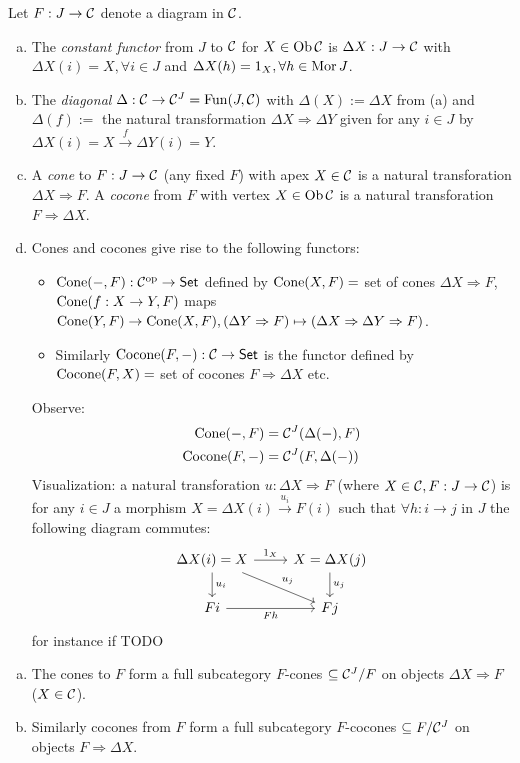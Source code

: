 \documentclass[a4paper]{report}
\begin{document}
\begin{defi} Let $F: J \to \mathcal{C}$ denote a diagram in $\mathcal{C}$.
  \begin{enumerate}[(a)]
    \item The \emph{constant functor} from $J$ to $\mathcal{C}$ for $X \in \operatorname{Ob} \mathcal{C}$ is $\Delta X: J \to \mathcal{C}$ with $\Delta X(i) = X, \forall i \in J$ and $\Delta X(h) = 1_{X}, \forall h \in \operatorname{Mor} J$.
    \item The \emph{diagonal} $\Delta: \mathcal{C} \to \mathcal{C}^{J} = \operatorname{Fun}(J, \mathcal{C})$ with $\Delta(X) := \Delta X$ from (a) and $\Delta(f):= $ the natural transformation $\Delta X \Rightarrow \Delta Y$ given for any $i \in J$ by $\Delta X(i) = X \xrightarrow f \Delta Y(i) = Y$.
    \item A \emph{cone} to $F: J \to \mathcal{C}$ (any fixed $F$) with apex $X \in \mathcal{C}$ is a natural transforation $\Delta X \Rightarrow F$. A \emph{cocone} from $F$ with vertex $X \in \operatorname{Ob} \mathcal{C}$ is a natural transforation $F \Rightarrow \Delta X$.
    \item Cones and cocones give rise to the following functors:
\begin{itemize}
  \item $\operatorname{Cone}(-, F): \mathcal{C}^\text{op} \to \mathsf{Set}$ defined by $\operatorname{Cone}(X,F) = $ set of cones  $\Delta X \Rightarrow F$, $\operatorname{Cone}(f: X \to Y, F)$ maps $\operatorname{Cone}(Y,F) \to \operatorname{Cone}(X,F), (\Delta Y \Rightarrow F) \mapsto (\Delta X \Rightarrow \Delta Y \Rightarrow F)$.
        \item Similarly $\operatorname{Cocone}(F, -): \mathcal{C} \to \mathsf{Set}$ is the functor defined by $\operatorname{Cocone}(F, X) =$ set of cocones $F \Rightarrow \Delta X$ etc.
\end{itemize}
          Observe: \begin{align*}
            \operatorname{Cone}(-,F) &= \mathcal{C}^{J}(\Delta(-),F)\\
            \operatorname{Cocone}(F,-) &= \mathcal{C}^{J}(F, \Delta(-))
          \end{align*}
          Visualization: a natural transforation $u: \Delta X \Rightarrow F$ (where $X \in\mathcal{C}, F: J \to \mathcal{C}$) is for any $i \in J$ a morphism $X = \Delta X(i) \xrightarrow{u_{i}} F(i)$ such that $\forall h: i \to j$ in $J$ the following diagram commutes:
          \[\begin{tikzcd}
\Delta X(i) = X \arrow[d, "u_i"] \arrow[rd, "u_j"] \arrow[r, "1_X"] & X = \Delta X(j) \arrow[d, "u_j"] \\
Fi \arrow[r, "Fh"']                                                 & Fj
\end{tikzcd}\]
          for instance if TODO
  \end{enumerate}
\end{defi}
\begin{rem}
\begin{enumerate}[(a)]
  \item The cones to $F$ form a full subcategory $F$-cones $\subseteq \mathcal{C}^{J}/F$ on objects $\Delta X \Rightarrow F$ ($X \in \mathcal{C}$).
        \item Similarly cocones from $F$ form a full subcategory $F$-cocones $\subseteq F/{\mathcal{C}^{J}}$ on objects $F \Rightarrow \Delta X$.
\end{enumerate}
\end{rem}
\end{document}

